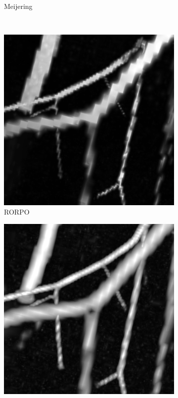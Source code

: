 \begin{figure}[!ht]
\begin{subfigure}[t]{0.30\textwidth}
      \caption{Meijering}
    \end{subfigure}
    \\
    \begin{subfigure}[t]{0.30\textwidth}
      \includegraphics[clip = true, trim  =  170 230 150 240, width=\textwidth]{Images/Vascu_2_k_RORPO.png}
      \caption{RORPO}
    \end{subfigure}
    \begin{subfigure}[t]{0.30\textwidth}
      \includegraphics[clip = true, trim  =  170 230 150 240, width=\textwidth]{Images/Vascu_2_k_Sato.png}

\end{subfigure}
\end{figure}
